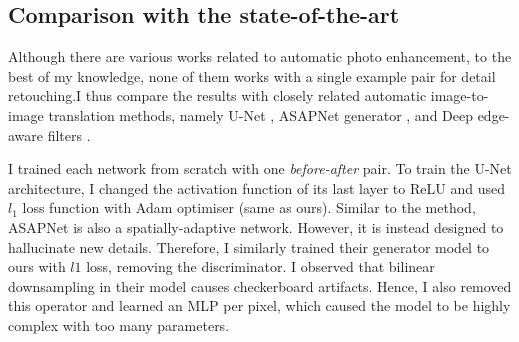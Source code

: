 \subsection{Comparison with the state-of-the-art}
\label{sec:Comparisons}


Although there are various works related to automatic photo enhancement, to the best of my knowledge, none of them works with a single example pair for detail retouching.I thus compare the results with closely related automatic image-to-image translation methods, namely U-Net \cite{ronneberger2015u}, ASAPNet generator \cite{shaham2021spatially}, and Deep edge-aware filters \cite{xu2015deep}. 

I trained each network from scratch with one \textit{before-after} pair. To train the U-Net architecture, I changed the activation function of its last layer to ReLU and used $l_1$ loss function with Adam optimiser (same as ours). Similar to the method, ASAPNet is also a spatially-adaptive network. However, it is instead designed to hallucinate new details. Therefore, I similarly trained their generator model to ours with $l1$ loss, removing the discriminator. I observed that bilinear downsampling in their model causes checkerboard artifacts. Hence, I also removed this operator and learned an MLP per pixel, which caused the model to be highly complex with too many parameters. 


